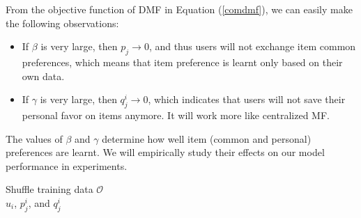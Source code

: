 From the objective function of DMF in Equation (\ref{comdmf}), we can easily make the following observations:
\begin{itemize}
\item If $\beta$ is very large, then $p_j \rightarrow 0$, and thus users will not exchange item common preferences, which means that item preference is learnt only based on their own data. 
\item If $\gamma$ is very large, then $q^i_j \rightarrow 0$, which indicates that users will not save their personal favor on items anymore. 
It will work more like centralized MF. 
\end{itemize}

The values of $\beta$ and $\gamma$ determine how well item (common and personal) preferences are learnt. We will empirically study their effects on our model performance in experiments. 

\begin{algorithm}[t]\label{dmflearning}
\caption{Random Walk Enhanced Nearby Collaborative DMF Optimization}

{
	Shuffle training data $\mathcal{O}$\\
}
\Return $u_i$, $p^i_j$, and $q^i_j$
\end{algorithm}

